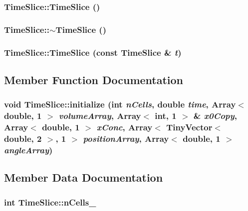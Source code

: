 \subsubsection{\setlength{\rightskip}{0pt plus 5cm}TimeSlice::TimeSlice ()}\label{classTimeSlice_789cab1f5cdcd4dcdc909ed89de1a4f8}


\subsubsection{\setlength{\rightskip}{0pt plus 5cm}TimeSlice::$\sim$TimeSlice ()}\label{classTimeSlice_5934f3fe05382a5e076b9f26980061ab}


\subsubsection{\setlength{\rightskip}{0pt plus 5cm}TimeSlice::TimeSlice (const {\bf TimeSlice} \& {\em t})}\label{classTimeSlice_71623f8af5738803fe94f8c48edc14bd}




\subsection{Member Function Documentation}
\subsubsection{\setlength{\rightskip}{0pt plus 5cm}void TimeSlice::initialize (int {\em nCells}, \/  double {\em time}, \/  Array$<$ double, 1 $>$ {\em volumeArray}, \/  Array$<$ int, 1 $>$ \& {\em x0Copy}, \/  Array$<$ double, 1 $>$ {\em xConc}, \/  Array$<$ TinyVector$<$ double, 2 $>$, 1 $>$ {\em positionArray}, \/  Array$<$ double, 1 $>$ {\em angleArray})}\label{classTimeSlice_44ae72b40a715233689db70a0ba24a37}




\subsection{Member Data Documentation}
\subsubsection{\setlength{\rightskip}{0pt plus 5cm}int {\bf TimeSlice::nCells\_\-}}\label{classTimeSlice_8c39fe1d753d9af20ea7792cf727ca95}


